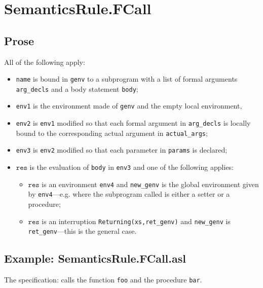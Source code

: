 \documentclass{book}
\newcommand\vres[0]{\texttt{res}}
\begin{document}

\section{SemanticsRule.FCall \label{sec:SemanticsRule.FCall}}

  \subsection{Prose}
  All of the following apply:
  \begin{itemize}
  \item \texttt{name} is bound in \texttt{genv} to a subprogram with a list of formal arguments
    \texttt{arg\_decls} and a body statement \texttt{body};
  \item \texttt{env1} is the environment made of \texttt{genv} and the empty local environment,
  \item \texttt{env2} is \texttt{env1} modified so that each formal argument in \texttt{arg\_decls} is
    locally bound to the corresponding actual argument in \texttt{actual\_args};
  \item \texttt{env3} is \texttt{env2} modified so that each parameter in \texttt{params} is declared;
  \item $\vres$ is the evaluation of \texttt{body} in \texttt{env3} and one of the following
    applies:
      \begin{itemize}
      \item $\vres$ is an environment \texttt{env4} and \texttt{new\_genv} is the global environment
        given by \texttt{env4}---e.g. where the subprogram called is either a setter or
        a procedure;
      \item $\vres$ is an interruption \texttt{Returning(xs,ret\_genv)} and \texttt{new\_genv} is
        \texttt{ret\_genv}---this is the general case.
      \end{itemize}
  \end{itemize}

  \subsection{Example: SemanticsRule.FCall.asl}
  The specification:
  calls the function \texttt{foo} and the procedure \texttt{bar}.
\end{document}
